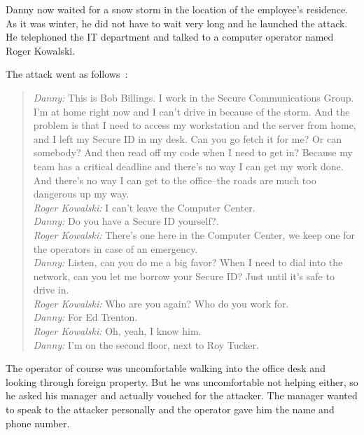 Danny now waited for a snow storm in the location of the employee's residence.
As it was winter, he did not have to wait very long and he launched the attack.
He telephoned the IT department and talked to a computer operator named Roger
Kowalski.

The attack went as follows~\cite[p. 86]{mitnick2003}:

\begin{quote}
\textit{Danny:} \glqq{}This is Bob Billings. I work in the Secure Communications Group. I'm at
home right now and I can't drive in because of the storm. And the problem is
that I need to access my workstation and the server from home, and I left my
Secure ID in my desk. Can you go fetch it for me? Or can somebody? And then
read off my code when I need to get in? Because my team has a critical deadline
and there's no way I can get my work done. And there's no way I can get to the
office--the roads are much too dangerous up my way.\grqq{}\\
\textit{Roger Kowalski:} \glqq{}I can't leave the Computer Center.\grqq{}\\
\textit{Danny:} \glqq{}Do you have a Secure ID yourself?.\grqq{}\\
\textit{Roger Kowalski:} \glqq{}There's one here in the Computer Center, we keep one
for the operators in case of an emergency.\grqq{}\\
\textit{Danny:} \glqq{}Listen, can you do me a big favor? When I need to dial into
the network, can you let me borrow your Secure ID? Just until it's safe to
drive in.\grqq{}\\
\textit{Roger Kowalski:} \glqq{}Who are you again? Who do you work for.\grqq{}\\
\textit{Danny:} \glqq{}For Ed Trenton.\grqq{}\\
\textit{Roger Kowalski:} \glqq{}Oh, yeah, I know him.\grqq{}\\
\textit{Danny:} \glqq{}I'm on the second floor, next to Roy Tucker.\grqq{}\\

\end{quote}

The operator of course was uncomfortable walking into the office desk and
looking through foreign property. But he was uncomfortable not helping either,
so he asked his manager and actually vouched for the attacker. The manager
wanted to speak to the attacker personally and the operator gave him the name
and phone number.

